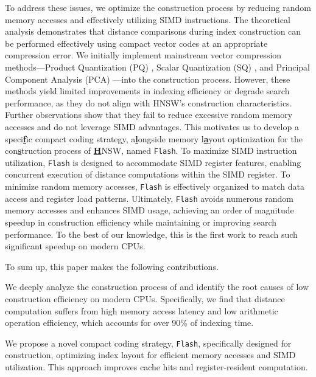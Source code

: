 To address these issues, we optimize the  construction process by reducing random memory accesses and effectively utilizing SIMD instructions. The theoretical analysis demonstrates that distance comparisons during index construction can be performed effectively using compact vector codes at an appropriate compression error. We initially implement mainstream vector compression methods—Product Quantization (PQ) \cite{PQ}, Scalar Quantization (SQ) \cite{LVQ}, and Principal Component Analysis (PCA) \cite{PCA}—into the  construction process. However, these methods yield limited improvements in indexing efficiency or degrade search performance, as they do not align with HNSW's construction characteristics. Further observations show that they fail to reduce excessive random memory accesses and do not leverage SIMD advantages.
This motivates us to develop a speci\underline{\textbf{f}}ic compact coding strategy, a\underline{\textbf{l}}ongside memory l\underline{\textbf{a}}yout optimization for the con\underline{\textbf{s}}truction process of \underline{\textbf{H}}NSW, named \texttt{Flash}. To maximize SIMD instruction utilization, \texttt{Flash} is designed to accommodate SIMD register features, enabling concurrent execution of distance computations within the SIMD register. To minimize random memory accesses, \texttt{Flash} is effectively organized to match data access and register load patterns.
Ultimately, \texttt{Flash} avoids numerous random memory accesses and enhances SIMD usage, achieving an order of magnitude speedup in construction efficiency while maintaining or improving search performance. To the best of our knowledge, this is the first work to reach such significant speedup on modern CPUs.

To sum up, this paper makes the following contributions.

\squishlist

\item We deeply analyze the construction process of  and identify the root causes of low construction efficiency on modern CPUs. Specifically, we find that distance computation suffers from high memory access latency and low arithmetic operation efficiency, which accounts for over 90\% of indexing time.

\item We propose a novel compact coding strategy, \texttt{Flash}, specifically designed for  construction, optimizing index layout for efficient memory accesses and SIMD utilization. This approach improves cache hits and register-resident computation.


